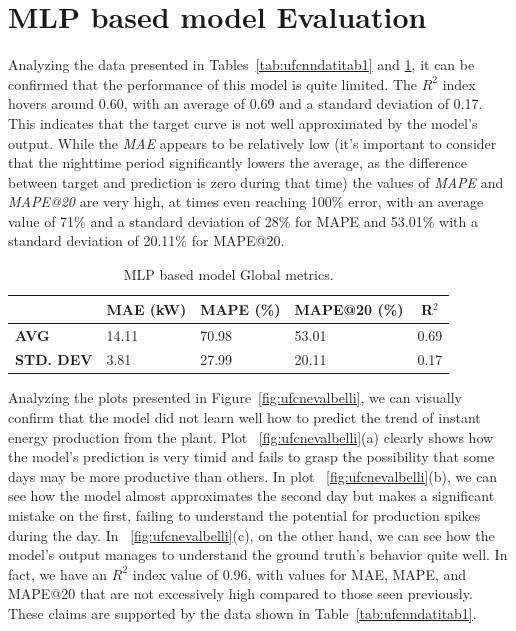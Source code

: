 
\section{MLP based model Evaluation}\label{sec:mlpeval}
Analyzing the data presented in Tables~\ref{tab:ufcnndatitab1}
and \ref{tab:globalmetrics}, it can be confirmed that the performance
of this model is quite limited.
The $R^2$ index hovers around 0.60, with an average of 0.69 and a standard deviation of 0.17. This indicates that the target curve is not well approximated by the model's output.
While the \textit{MAE} appears to be relatively low (it's
important to consider that the nighttime period significantly lowers
the average, as the difference between target and prediction is zero during that time) the values of \textit{MAPE} and \textit{MAPE@20} are very high, at times even reaching 100\% error, with an average value of 71\% and a standard deviation of 28\% for MAPE and 53.01\% with a standard deviation of 20.11\% for MAPE@20.

\begin{table}[H]
	\centering
	\begin{tabular}{l|l|l|l|l}
		                                           &
		\multicolumn{1}{c|}{\textbf{MAE (kW)}}     &
		\multicolumn{1}{c|}{\textbf{MAPE (\%)}}    &
		\multicolumn{1}{c|}{\textbf{MAPE@20 (\%)}} &
		\multicolumn{1}{c}{\textbf{R$^2$}}                                        \\
		\hline
		\textbf{AVG}                               & 14.11 & 70.98 & 53.01 & 0.69 \\
		\textbf{STD. DEV}                          & 3.81  & 27.99 & 20.11 & 0.17
	\end{tabular}
	\caption{MLP based model Global metrics.}
	\label{tab:globalmetrics}
\end{table}

Analyzing the plots presented in Figure~\ref{fig:ufcnevalbelli},
we can visually confirm that the model did not learn well how
to predict the trend of instant energy production from the plant.
Plot ~\ref{fig:ufcnevalbelli}(a) clearly shows how the model's prediction is very timid
and fails to grasp the possibility that some days may be more productive
than others.
In plot ~\ref{fig:ufcnevalbelli}(b), we can see how the model almost approximates the second
day but makes a significant mistake on the first,
failing to understand the potential for production spikes during the day. In ~\ref{fig:ufcnevalbelli}(c), on the other hand, we can see
how the model's output manages to understand the
ground truth's behavior quite well. In fact, we have an $R^2$ index value of 0.96, with values for MAE, MAPE, and MAPE@20 that are not excessively high compared to those seen previously. These claims are supported by the data shown in Table~\ref{tab:ufcnndatitab1}.

